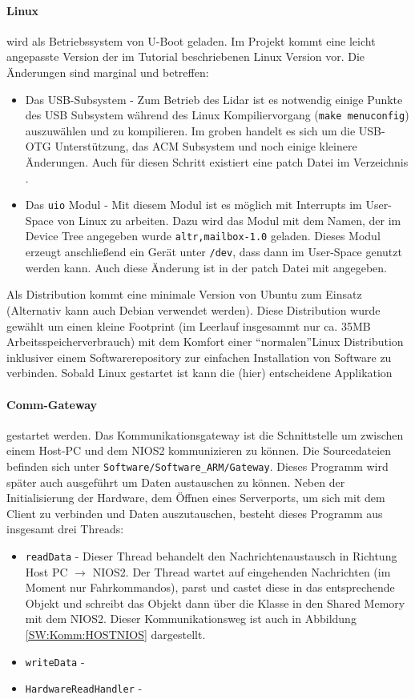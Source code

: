 \paragraph{Linux} wird als Betriebssystem von U-Boot geladen. Im Projekt kommt eine leicht angepasste Version der im Tutorial beschriebenen Linux Version vor. Die Änderungen sind marginal und betreffen:
\begin{itemize}
	\item Das USB-Subsystem - Zum Betrieb des \ac{Lidar} ist es notwendig einige Punkte des USB Subsystem während des Linux Kompiliervorgang (\lstinline|make menuconfig|) auszuwählen und zu kompilieren. Im groben handelt es sich um die USB-OTG Unterstützung, das ACM Subsystem und noch einige kleinere Änderungen. Auch für diesen Schritt existiert eine patch Datei im Verzeichnis .
	\item Das \texttt{uio} Modul - Mit diesem Modul ist es möglich mit Interrupts im User-Space von Linux zu arbeiten. Dazu wird das Modul mit dem Namen, der im Device Tree angegeben wurde \lstinline|altr,mailbox-1.0| geladen. Dieses Modul erzeugt anschließend ein Gerät unter \texttt{/dev}, dass dann im User-Space genutzt werden kann. Auch diese Änderung ist in der patch Datei mit angegeben.
\end{itemize}
Als Distribution kommt eine minimale Version von Ubuntu zum Einsatz (Alternativ kann auch Debian verwendet werden). Diese Distribution wurde gewählt um einen kleine Footprint (im Leerlauf insgesammt nur ca. 35MB Arbeitsspeicherverbrauch) mit dem Komfort einer \textquotedblleft normalen\textquotedblright Linux Distribution inklusiver einem Softwarerepository zur einfachen Installation von Software zu verbinden. Sobald Linux gestartet ist kann die (hier) entscheidene Applikation

\paragraph{Comm-Gateway} gestartet werden.
Das Kommunikationsgateway ist die Schnittstelle um zwischen einem Host-PC und dem NIOS2 kommunizieren zu können. Die Sourcedateien befinden sich unter \texttt{Software/Software\_ARM/Gateway}. Dieses Programm wird später auch ausgeführt um Daten austauschen zu können. Neben der Initialisierung der Hardware, dem Öffnen eines Serverports, um sich mit dem Client zu verbinden und Daten auszutauschen, besteht dieses Programm aus insgesamt drei Threads:
\begin{itemize}
	\item \lstinline|readData| - Dieser Thread behandelt den Nachrichtenaustausch in Richtung Host PC $\rightarrow$ NIOS2. Der Thread wartet auf eingehenden Nachrichten (im Moment nur Fahrkommandos), parst und castet diese in das entsprechende Objekt und schreibt das Objekt dann über die Klasse  in den Shared Memory mit dem NIOS2. Dieser Kommunikationsweg ist auch in Abbildung \ref{SW:Komm:HOSTNIOS} dargestellt.
	\item \lstinline|writeData| - 
	\item \lstinline|HardwareReadHandler| - 
\end{itemize}

